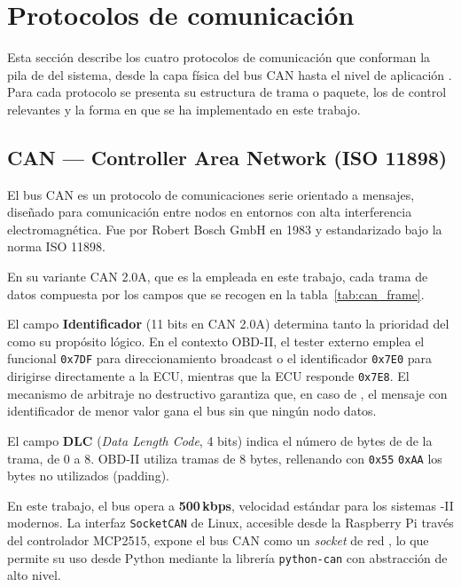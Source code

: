 \section{Protocolos de comunicación}
\label{sec:protocolos}

Esta sección describe los cuatro protocolos de comunicación que conforman la pila de  del sistema, desde la capa física del bus CAN hasta el nivel de aplicación . Para cada protocolo se presenta su estructura de trama o paquete, los  de control relevantes y la forma en que se ha implementado en este trabajo.


\subsection{CAN — Controller Area Network (ISO 11898)}
\label{sec:proto_can}

El bus CAN es un protocolo de comunicaciones serie orientado a mensajes, diseñado para  comunicación entre nodos en entornos con alta interferencia electromagnética. Fue  por Robert Bosch GmbH en 1983 y estandarizado bajo la norma ISO 11898.

En su variante CAN 2.0A, que es la empleada en este trabajo, cada trama de datos  compuesta por los campos que se recogen en la tabla~\ref{tab:can_frame}.

% 

El campo \textbf{Identificador} (11 bits en CAN 2.0A) determina tanto la prioridad del  como su propósito lógico. En el contexto OBD-II, el tester externo emplea el  funcional \texttt{0x7DF} para direccionamiento broadcast o el identificador  \texttt{0x7E0} para dirigirse directamente a la ECU, mientras que la ECU responde  \texttt{0x7E8}. El mecanismo de arbitraje no destructivo garantiza que, en caso de , el mensaje con identificador de menor valor gana el bus sin que ningún nodo  datos.

El campo \textbf{DLC} (\textit{Data Length Code}, 4 bits) indica el número de bytes de  de la trama, de 0 a 8. OBD-II utiliza tramas de 8 bytes, rellenando con \texttt{0x55}  \texttt{0xAA} los bytes no utilizados (padding).

En este trabajo, el bus opera a \textbf{500\,kbps}, velocidad estándar para los sistemas -II modernos. La interfaz \texttt{SocketCAN} de Linux, accesible desde la Raspberry Pi  través del controlador MCP2515, expone el bus CAN como un \textit{socket} de red , lo que permite su uso desde Python mediante la librería \texttt{python-can} con  abstracción de alto nivel.


